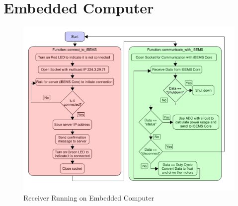 \section{Embedded Computer}

\begin{figure}[H]
    \centering
    \includegraphics[scale=0.5]{figs/Beaglebone_Receiver_Diagram.pdf}
    \caption{Receiver Running on Embedded Computer}
    \label{fig:Beaglebone_Receiver_Diagram}
\end{figure}

